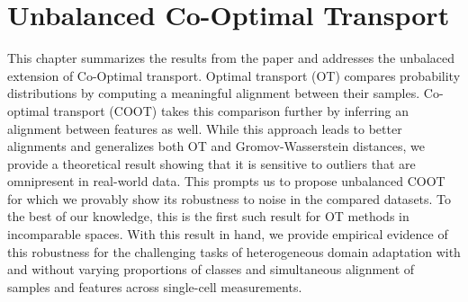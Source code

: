 
\chapter[Unbalanced Co-Optimal Transport]{Unbalanced Co-Optimal Transport}
\label{chap:ucoot}

\renewcommand{\contentsname}{Contents}
\localtableofcontents*
{}

\hfill \break

\raggedbottom



This chapter summarizes the results from the paper \citep{Tran23} and addresses
the unbalaced extension of Co-Optimal transport.
Optimal transport (OT) compares probability distributions by computing a meaningful alignment
between their samples. Co-optimal transport (COOT) takes this comparison further
by inferring an alignment between features as well. While this approach leads to
better alignments and generalizes both OT and Gromov-Wasserstein distances,
we provide a theoretical result showing that it is sensitive to outliers
that are omnipresent in real-world data. This prompts us to propose unbalanced COOT
for which we provably show its robustness to noise in the compared datasets.
To the best of our knowledge, this is the first such result for OT methods in incomparable spaces.
With this result in hand, we provide empirical evidence of this robustness
for the challenging tasks of heterogeneous domain adaptation with and without
varying proportions of classes and simultaneous alignment of samples and features across
single-cell measurements.

